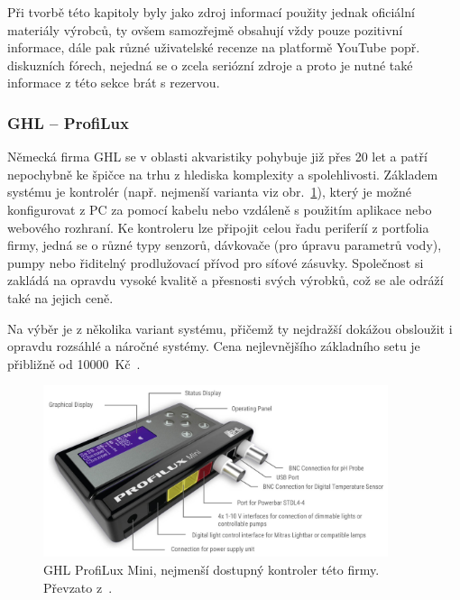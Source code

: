         Při tvorbě této kapitoly byly jako zdroj informací použity jednak oficiální materiály výrobců, ty ovšem samozřejmě obsahují vždy pouze pozitivní informace, dále pak různé uživatelské recenze na platformě YouTube popř. diskuzních fórech, nejedná se o zcela seriózní zdroje a proto je nutné také informace z této sekce brát s rezervou. 

        \subsubsection{GHL -- ProfiLux}
            Německá firma GHL se v oblasti akvaristiky pohybuje již přes 20 let a patří nepochybně ke špičce na trhu z hlediska komplexity a spolehlivosti. Základem systému je kontrolér (např. nejmenší varianta viz obr.~\ref{fig:obrazky-trh-GHL-ProfiLux-Mini-jpg}), který je možné konfigurovat z PC za pomocí kabelu nebo vzdáleně s použitím aplikace nebo webového rozhraní. Ke kontroleru lze připojit celou řadu periferíí z portfolia firmy, jedná se o různé typy senzorů, dávkovače (pro úpravu parametrů vody), pumpy nebo řiditelný prodlužovací přívod pro síťové zásuvky. Společnost si zakládá na opravdu vysoké kvalitě a přesnosti svých výrobků, což se ale odráží také na jejich ceně. 

            Na výběr je z několika variant systému, přičemž ty nejdražší dokážou obsloužit i opravdu rozsáhlé a náročné systémy. Cena nejlevnějšího základního setu je přibližně od \qty{10000}{Kč}~\cite{ghl-profilux,eshop-ghl-profilux-sets}.

            \begin{figure}[h!]
                \centering
                \includegraphics[width=0.9\textwidth]{obrazky/trh/GHL-ProfiLux-Mini.jpg}
                \caption{GHL ProfiLux Mini, nejmenší dostupný kontroler této firmy. Převzato z~\cite{ghl-profilux}.}
                \label{fig:obrazky-trh-GHL-ProfiLux-Mini-jpg}
            \end{figure}
            
